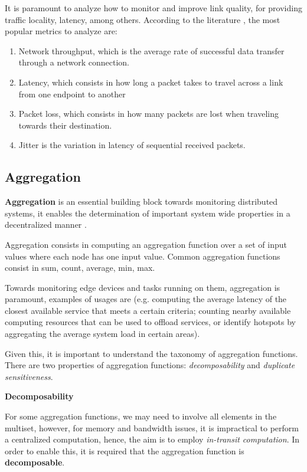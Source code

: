 It is paramount to analyze how to monitor and improve link quality, for providing traffic locality, latency, among others. According to the literature \cite{}, the most popular metrics to analyze are:

\begin{enumerate}

    \item Network throughput, which is the average rate of successful data transfer through a network connection.
    
    \item Latency, which consists in how long a packet takes to travel across a link from one endpoint to another
    
    \item Packet loss, which consists in how many packets are lost when traveling towards their destination.
    
    \item Jitter is the variation in latency of sequential received packets. 
\end{enumerate}

\subsection{Aggregation}

\textbf{Aggregation} is an essential building block towards monitoring distributed systems, it enables the determination of important system wide properties in a decentralized manner \cite{DBLP:journals/corr/abs-1110-0725}. 

Aggregation consists in computing an aggregation function over a set of input values where each node has one input value. Common aggregation functions consist in sum, count, average, min, max.

Towards monitoring edge devices and tasks running on them, aggregation is paramount, examples of usages are (e.g. computing the average latency of the closest available  service that meets a certain criteria; counting nearby available computing resources that can be used to offload services, or identify hotspots by aggregating the average system load in certain areas).

Given this, it is important to understand the taxonomy of aggregation functions. There are two properties of aggregation functions: \textit{decomposability} and \textit{duplicate sensitiveness}.

\textbf{Decomposability}

For some aggregation functions, we may need to involve all elements in the multiset, however, for memory and bandwidth issues, it is impractical to perform a centralized computation, hence, the aim is to employ \textit{in-transit computation}. In order to enable this, it is required that the aggregation function is \textbf{decomposable}. 

